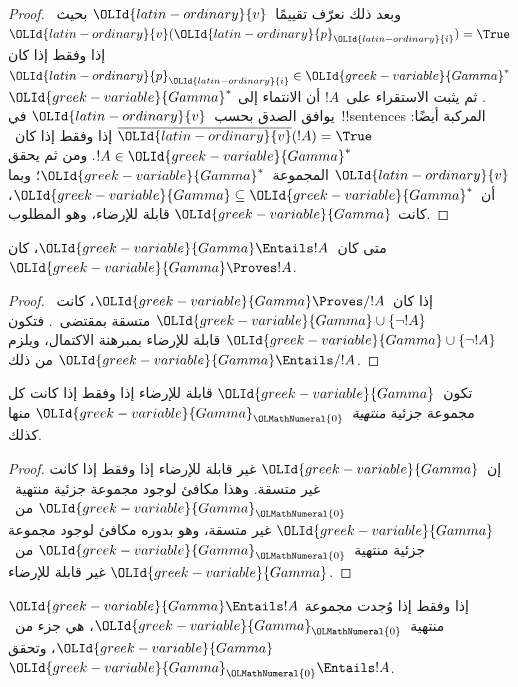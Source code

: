 \documentclass[../../../include/open-logic-section]{subfiles}
\begin{document}
\begin{proof}
وبعد ذلك نعرّف تقييمًا~${\OLId{latin-ordinary}{v}}$ بحيث~${\OLId{latin-ordinary}{v}}({\OLId{latin-ordinary}{p}}_{\OLId{latin-ordinary}{i}})=\True$ إذا وفقط إذا كان
${\OLId{latin-ordinary}{p}}_{\OLId{latin-ordinary}{i}}\in{\OLId{greek-variable}{Gamma}}^*$. ثم يثبت الاستقراء على~$!A$ أن الانتماء إلى
${\OLId{greek-variable}{Gamma}}^*$ يوافق الصدق بحسب~${\OLId{latin-ordinary}{v}}$ في~!!{sentence}s المركبة أيضًا:
$\overline{{\OLId{latin-ordinary}{v}}}(!A)=\True$ إذا وفقط إذا كان~$!A\in{\OLId{greek-variable}{Gamma}}^*$. ومن ثم يحقق
${\OLId{latin-ordinary}{v}}$ المجموعة~${\OLId{greek-variable}{Gamma}}^*$؛ وبما أن~${\OLId{greek-variable}{Gamma}}\subseteq{\OLId{greek-variable}{Gamma}}^*$، كانت
${\OLId{greek-variable}{Gamma}}$ قابلة للإرضاء، وهو المطلوب.
\end{proof}

\begin{cor}
متى كان~${\OLId{greek-variable}{Gamma}}\Entails !A$، كان~${\OLId{greek-variable}{Gamma}}\Proves !A$.
\end{cor}

\begin{proof}
إذا كان~${\OLId{greek-variable}{Gamma}}\Proves/ !A$، كانت~${\OLId{greek-variable}{Gamma}}\cup\{\lnot !A\}$ متسقة
بمقتضى~. فتكون
${\OLId{greek-variable}{Gamma}}\cup\{\lnot !A\}$ قابلة للإرضاء بمبرهنة الاكتمال، ويلزم من ذلك
${\OLId{greek-variable}{Gamma}}\Entails/ !A$.
\end{proof}

\begin{prop}
تكون~${\OLId{greek-variable}{Gamma}}$ قابلة للإرضاء إذا وفقط إذا كانت كل مجموعة جزئية
\emph{منتهية}~${\OLId{greek-variable}{Gamma}}_{\OLMathNumeral{0}}$ منها كذلك.
\end{prop}

\begin{proof}
إن~${\OLId{greek-variable}{Gamma}}$ غير قابلة للإرضاء إذا وفقط إذا كانت غير متسقة. وهذا مكافئ
لوجود مجموعة جزئية منتهية~${\OLId{greek-variable}{Gamma}}_{\OLMathNumeral{0}}$ من~${\OLId{greek-variable}{Gamma}}$ غير متسقة، وهو بدوره
مكافئ لوجود مجموعة جزئية منتهية~${\OLId{greek-variable}{Gamma}}_{\OLMathNumeral{0}}$ من~${\OLId{greek-variable}{Gamma}}$ غير قابلة للإرضاء.
\end{proof}

\begin{cor}
${\OLId{greek-variable}{Gamma}}\Entails !A$ إذا وفقط إذا وُجدت مجموعة منتهية~${\OLId{greek-variable}{Gamma}}_{\OLMathNumeral{0}}$، هي جزء
من~${\OLId{greek-variable}{Gamma}}$، وتحقق~${\OLId{greek-variable}{Gamma}}_{\OLMathNumeral{0}}\Entails !A$.
\end{cor}
\end{document}
